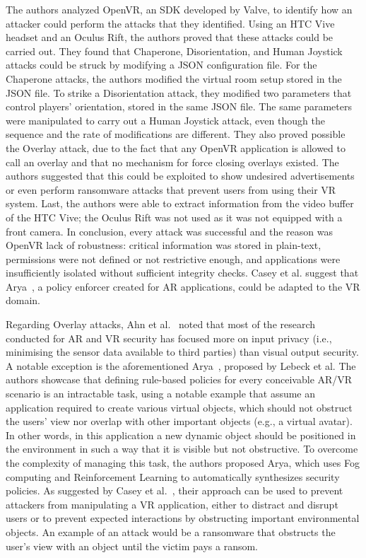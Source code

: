 \documentclass[journal]{IEEEtran}
\begin{document}
The authors analyzed OpenVR, an SDK developed by Valve, to identify how an attacker could perform the attacks that they identified. Using an HTC Vive headset and an Oculus Rift, the authors proved that these attacks could be carried out. They found that Chaperone, Disorientation, and Human Joystick attacks could be struck by modifying a JSON configuration file. For the Chaperone attacks, the authors modified the virtual room setup stored in the JSON file. To strike a Disorientation attack, they modified two parameters that control players' orientation, stored in the same JSON file. The same parameters were manipulated to carry out a Human Joystick attack, even though the sequence and the rate of modifications are different. They also proved possible the Overlay attack, due to the fact that any OpenVR application is allowed to call an overlay and that no mechanism for force closing overlays existed. The authors suggested that this could be exploited to show undesired advertisements or even perform ransomware attacks that prevent users from using their VR system.
Last, the authors were able to extract information from the video buffer of the HTC Vive; the Oculus Rift was not used as it was not equipped with a front camera. In conclusion, every attack was successful and the reason was OpenVR lack of robustness: critical information was stored in plain-text, permissions were not defined or not restrictive enough, and applications were insufficiently isolated without sufficient integrity checks. Casey et al. suggest that Arya~\cite{lebeck2017,lebeck2018}, a policy enforcer created for AR applications, could be adapted to the VR domain.

Regarding Overlay attacks, Ahn et al.~\cite{ahn2018} noted that most of the research conducted for AR and VR security has focused more on input privacy (i.e., minimising the sensor data available to third parties) than visual output security. A notable exception is the aforementioned Arya~\cite{lebeck2017,lebeck2018}, proposed by Lebeck et al. The authors showcase that defining rule-based policies for every conceivable AR/VR scenario is an intractable task, using a notable example that assume an application required to create various virtual objects, which should not obstruct the users' view nor overlap with other important objects (e.g., a virtual avatar). In other words, in this application a new dynamic object should be positioned in the environment in such a way that it is visible but not obstructive. To overcome the complexity of managing this task, the authors proposed Arya, which uses Fog computing and Reinforcement Learning to automatically synthesizes security policies. As suggested by Casey et al.~\cite{casey2019}, their approach can be used to prevent attackers from manipulating a VR application, either to distract and disrupt users or to prevent expected interactions by obstructing important environmental objects. An example of an attack would be a ransomware that obstructs the user's view with an object until the victim pays a ransom.
\end{document}
